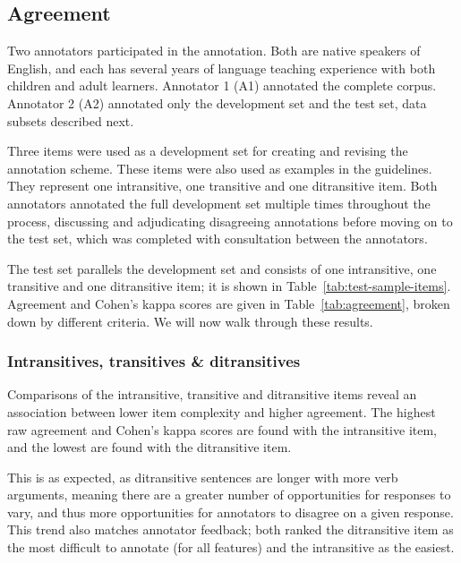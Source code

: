 \documentclass[11pt,a4paper]{article}
\begin{document}
\subsection{Agreement}
\label{sec:agreement}
Two annotators participated in the annotation. Both are native speakers of English, and each has several years of language teaching experience with both children and adult learners. Annotator 1 (A1) annotated the complete corpus. Annotator 2 (A2) annotated only the development set and the test set, data subsets described next.

Three items were used as a development set for creating and revising the annotation scheme. These items were also used as examples in the guidelines. They represent one intransitive, one transitive and one ditransitive item. Both annotators annotated the full development set multiple times throughout the process, discussing and adjudicating disagreeing annotations before moving on to the test set, which was completed with consultation between the annotators.

The test set parallels the development set and consists of one intransitive, one transitive and one ditransitive item; it is shown in Table~\ref{tab:test-sample-items}. Agreement and Cohen's kappa scores are given in Table~\ref{tab:agreement}, broken down by different criteria.  We will now walk through these results.

\subsubsection{Intransitives, transitives \& ditransitives} Comparisons of the intransitive, transitive and ditransitive items reveal an association between lower item complexity and higher agreement. The highest raw agreement and Cohen's kappa scores are found with the intransitive item, and the lowest are found with the ditransitive item. 

This is as expected, as ditransitive sentences are longer with more verb arguments, meaning there are a greater number of opportunities for responses to vary, and thus more opportunities for annotators to disagree on a given response. This trend also matches annotator feedback; both ranked the ditransitive item as the most difficult to annotate (for all features) and the intransitive as the easiest.
\end{document}
